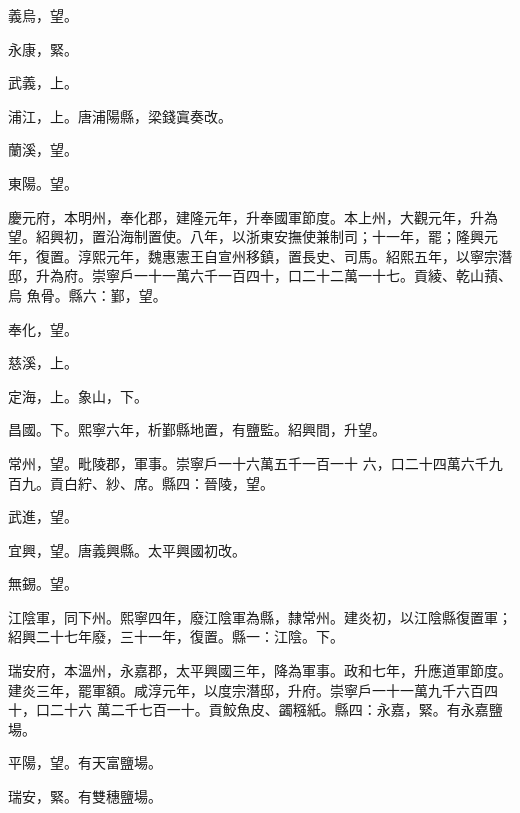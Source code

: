 \begin{pinyinscope}
 義烏，望。



 永康，緊。



 武義，上。



 浦江，上。唐浦陽縣，梁錢寘奏改。



 蘭溪，望。



 東陽。望。


慶元府，本明州，奉化郡，建隆元年，升奉國軍節度。本上州，大觀元年，升為望。紹興初，置沿海制置使。八年，以浙東安撫使兼制司；十一年，罷；隆興元年，復置。淳熙元年，魏惠憲王自宣州移鎮，置長史、司馬。紹熙五年，以寧宗潛邸，升為府。崇寧戶一十一萬六千一百四十，口二十二萬一十七。貢綾、乾山蕷、烏
 魚骨。縣六：鄞，望。



 奉化，望。



 慈溪，上。



 定海，上。象山，下。



 昌國。下。熙寧六年，析鄞縣地置，有鹽監。紹興間，升望。



 常州，望。毗陵郡，軍事。崇寧戶一十六萬五千一百一十
 六，口二十四萬六千九百九。貢白紵、紗、席。縣四：晉陵，望。



 武進，望。



 宜興，望。唐義興縣。太平興國初改。



 無錫。望。



 江陰軍，同下州。熙寧四年，廢江陰軍為縣，隸常州。建炎初，以江陰縣復置軍；紹興二十七年廢，三十一年，復置。縣一：江陰。下。



 瑞安府，本溫州，永嘉郡，太平興國三年，降為軍事。政和七年，升應道軍節度。建炎三年，罷軍額。咸淳元年，以度宗潛邸，升府。崇寧戶一十一萬九千六百四十，口二十六
 萬二千七百一十。貢鮫魚皮、蠲糨紙。縣四：永嘉，緊。有永嘉鹽場。



 平陽，望。有天富鹽場。



 瑞安，緊。有雙穗鹽場。




\end{pinyinscope}
